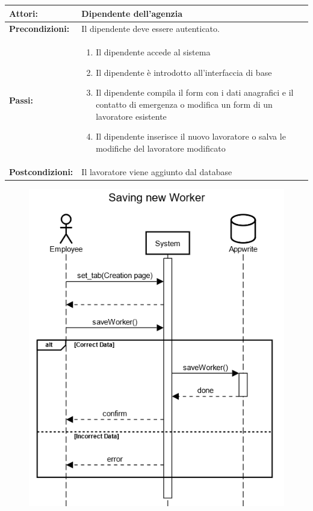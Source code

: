 \documentclass[a4paper, oneside, 12pt]{article}
\begin{document}
\begin{tabular}{ | l | p{11cm} | } 
	\hline
	\textbf{Attori:} & Dipendente dell'agenzia  \\ 
	\hline
	\textbf{Precondizioni:} & Il dipendente deve essere autenticato. \\
	\hline
	\textbf{Passi:} &
		\begin{enumerate}
			\item Il dipendente accede al sistema
			\item Il dipendente è introdotto all'interfaccia di base
			\item Il dipendente compila il form con i dati anagrafici e il contatto di emergenza o modifica un form di un lavoratore esistente 
			\item Il dipendente inserisce il nuovo lavoratore o salva le modifiche del lavoratore modificato
		\end{enumerate} \\
	\hline
	\textbf{Postcondizioni:} &  Il lavoratore viene aggiunto dal database \\
	\hline
  \end{tabular}


\begin{figure}[h!]
	\centering
	\includegraphics[width = 8 cm]{images/aggiunta}
	\label{fig:Inserimento lavoratore}
\end{figure}
\end{document}
